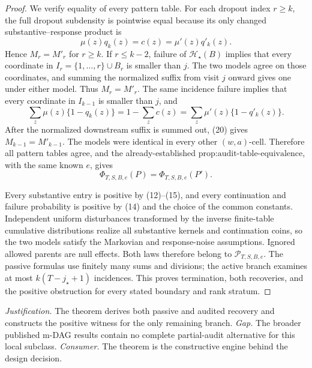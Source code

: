 \documentclass{article}
\begin{document}
\begin{proof}
We verify equality of every pattern table.  For each dropout index \(r\ge k\), the full dropout subdensity is pointwise equal because its only changed substantive--response product is
\[
\mu(z)q_k(z)=c(z)=\mu'(z)q'_k(z).
\tag{19}
\]
Hence \(M_r=M'_r\) for \(r\ge k\).  If \(r\le k-2\), failure of
\(\mathcal H_\star(B)\) implies that every coordinate in
\(I_r=\{1,\ldots,r\}\cup B_r\) is smaller than \(j\).  The two models agree on those coordinates, and summing the normalized suffix from visit \(j\) onward gives one under either model.  Thus \(M_r=M'_r\).  The same incidence failure implies that every coordinate in \(I_{k-1}\) is smaller than \(j\), and
\[
\sum_z\mu(z)\{1-q_k(z)\}
=1-\sum_zc(z)
=\sum_z\mu'(z)\{1-q'_k(z)\}.
\tag{20}
\]
After the normalized downstream suffix is summed out, (20) gives
\(M_{k-1}=M'_{k-1}\).  The models were identical in every other \((w,a)\)-cell.  Therefore all pattern tables agree, and the already-established
\(\text{prop:audit-table-equivalence}\), with the same known \(e\), gives
\[
\Phi_{T,S,B,e}(P)=\Phi_{T,S,B,e}(P').
\tag{21}
\]

Every substantive entry is positive by (12)--(15), and every continuation and failure probability is positive by (14) and the choice of the common constants.  Independent uniform disturbances transformed by the inverse finite-table cumulative distributions realize all substantive kernels and continuation coins, so the two models satisfy the Markovian and response-noise assumptions.  Ignored allowed parents are null effects.  Both laws therefore belong to \(\mathcal P_{T,S,B,e}\).  The passive formulas use finitely many sums and divisions; the active branch examines at most \(k(T-j_\star+1)\) incidences.  This proves termination, both recoveries, and the positive obstruction for every stated boundary and rank stratum.
\end{proof}
\par\smallskip\noindent \textit{Justification.} The theorem derives both passive and audited recovery and constructs the positive witness for the only remaining branch. \textit{Gap.} The broader published m-DAG results contain no complete partial-audit alternative for this local subclass. \textit{Consumer.} The theorem is the constructive engine behind the design decision.
\end{document}
